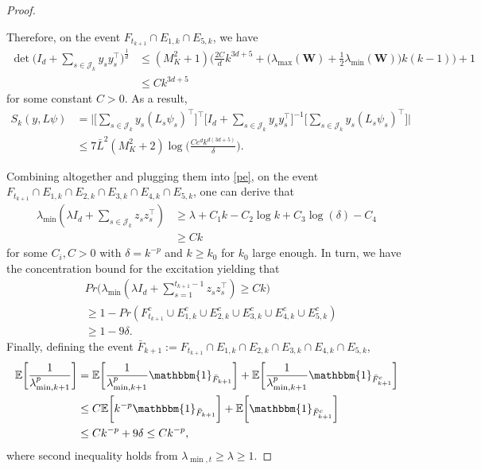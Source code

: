 \documentclass[11pt]{article}
\theoremstyle{plain}
\theoremstyle{definition}
\theoremstyle{remark}
\begin{document}
\begin{proof}
\begin{itemize}
Therefore, on the event $F_{t_{k+1}} \cap E_{1,k}\cap E_{5,k}$, we have
\begin{align*}
    \det\bigg(I_d+\sum_{s\in\mathcal{J}_k} y_s y_s^{\top}\bigg)^{\frac{1}{d}}&\leq (M_K^2+1)\bigg(\frac{2C}{d}k^{3d+5}+ \bigg(\lambda_{\max}(\mathbf{W}) +\frac{1}{2}\lambda_{\min}(\mathbf{W})\bigg)k(k-1)\bigg)+1\\
    &\leq C k^{3d+5}
\end{align*}
for some constant $C>0$. As a result,
\begin{equation*}
\begin{split}
S_k(y,L\psi)&=\bigg|\bigg[\sum_{s\in\mathcal{J}_k} y_s (L_s \psi_{s})^{\top}\bigg]^{\top}\bigg[I_d+\sum_{s\in\mathcal{J}_k}y_sy_s^{\top}\bigg]^{-1}\bigg[\sum_{s\in\mathcal{J}_k} y_s (L_s \psi_{s})^{\top}\bigg]\bigg|\\
&\leq 7\bar L^2(M_K^2+2)\log\bigg(\frac{Ce^d k^{d(3d+5)}}{\delta}\bigg).
\end{split}
\end{equation*}


\end{itemize}

Combining altogether and plugging them into \eqref{pe}, on the event $F_{t_{k+1}} \cap E_{1,k} \cap E_{2,k}\cap E_{3,k}\cap E_{4,k}\cap E_{5,k}$, one can derive that
\begin{equation*}
\begin{split}
    \lambda_{\min}(\lambda I_d + \sum_{s\in \mathcal{J}_k} z_s z_s^{\top}) 
    &\geq  \lambda+ C_1 k - C_2\log k  + C_3 \log(\delta)-C_4\\
    & \geq C k
\end{split}
\end{equation*}
for some $C_i,C>0$ with $\delta=k^{-p}$ and $k \geq k_0$ for $k_0$ large enough. In turn, we have the concentration bound for the excitation yielding that 
\begin{align*}
    &Pr\bigg(\lambda_{\min}(\lambda I_d + \sum_{s=1}^{t_{k+1}-1} z_s z_s^{\top}) \geq C k\bigg)\\
    & \geq 1-Pr(F^c_{t_{k+1}} \cup E^c_{1,k} \cup E^c_{2,k}\cup E^c_{3,k}\cup E^c_{4,k}\cup E^c_{5,k})\\
    & \geq 1-9\delta.
\end{align*}
Finally, defining the event $\bar{F}_{k+1}:=F_{t_{k+1}}\cap E_{1,k} \cap E_{2,k}\cap E_{3,k}\cap E_{4,k}\cap E_{5,k}$,
\begin{align*}
    \mathbb{E}\bigg[\frac{1}{\lambda^p_{\min,k+1}}\bigg] 
    &= \mathbb{E}\bigg[\frac{1}{\lambda^p_{\min,k+1}}\mathbbm{1}_{\bar{F}_{k+1}}\bigg] + \mathbb{E}\bigg[\frac{1}{\lambda^p_{\min,k+1}}\mathbbm{1}_{\bar{F}_{k+1}^c}\bigg]\nonumber\\
    &\leq C\mathbb{E}\bigg[ k^{-p}\mathbbm{1}_{\bar{F}_{k+1}}\bigg] + \mathbb{E}\bigg[\mathbbm{1}_{\bar{F}_{k+1}^c}\bigg]\nonumber\\
    &\leq C k^{-p} + 9\delta \leq C k^{-p},
\end{align*}
where second inequality holds from $\lambda_{\min,t} \geq \lambda \geq 1$. 
\end{proof}
\end{document}
